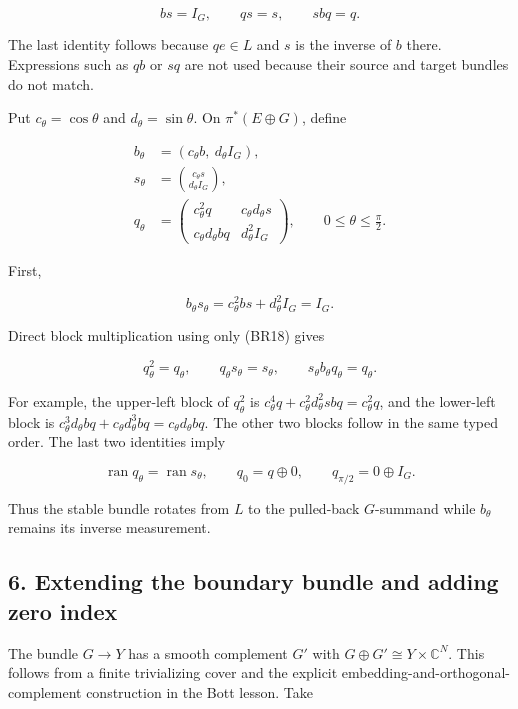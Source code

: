 \documentclass[
  11pt,
]{article}
\begin{document}
\[
 bs=I_G,\qquad qs=s,\qquad sbq=q .
 \tag{BR18}
\]

The last identity follows because \(qe\in L\) and \(s\) is the inverse
of \(b\) there. Expressions such as \(qb\) or \(sq\) are not used
because their source and target bundles do not match.

Put \(c_\theta=\cos\theta\) and \(d_\theta=\sin\theta\). On
\(\pi^*(E\oplus G)\), define

\[
 \begin{aligned}
 b_\theta&=(c_\theta b,\ d_\theta I_G),\\
 s_\theta&=\binom{c_\theta s}{d_\theta I_G},\\
 q_\theta&=
 \begin{pmatrix}
 c_\theta^2q&c_\theta d_\theta s\\
 c_\theta d_\theta bq&d_\theta^2I_G
 \end{pmatrix},
 \qquad 0\leq\theta\leq\frac{\pi}{2}.
 \end{aligned}
 \tag{BR19}
\]

First,

\[
 b_\theta s_\theta
 =c_\theta^2bs+d_\theta^2I_G=I_G .
 \tag{BR20}
\]

Direct block multiplication using only (BR18) gives

\[
 q_\theta^2=q_\theta,\qquad
 q_\theta s_\theta=s_\theta,\qquad
 s_\theta b_\theta q_\theta=q_\theta .
 \tag{BR21}
\]

For example, the upper-left block of \(q_\theta^2\) is
\(c_\theta^4q+c_\theta^2d_\theta^2sbq=c_\theta^2q\), and the lower-left
block is
\(c_\theta^3d_\theta bq+c_\theta d_\theta^3bq=c_\theta d_\theta bq\).
The other two blocks follow in the same typed order. The last two
identities imply

\[
 \operatorname{ran}q_\theta=\operatorname{ran}s_\theta,\qquad
 q_0=q\oplus0,\qquad
 q_{\pi/2}=0\oplus I_G .
 \tag{BR22}
\]

Thus the stable bundle rotates from \(L\) to the pulled-back
\(G\)-summand while \(b_\theta\) remains its inverse measurement.

\subsection{6. Extending the boundary bundle and adding zero
index}\label{extending-the-boundary-bundle-and-adding-zero-index}

The bundle \(G\to Y\) has a smooth complement \(G'\) with
\(G\oplus G'\cong Y\times\mathbb C^N\). This follows from a finite
trivializing cover and the explicit embedding-and-orthogonal-complement
construction in the Bott lesson. Take
\end{document}
